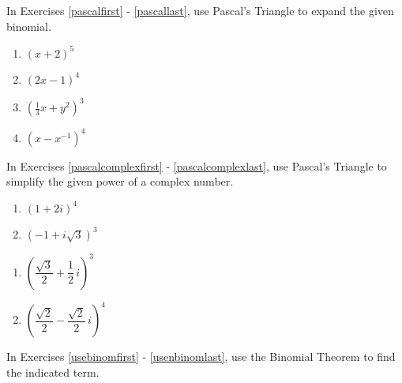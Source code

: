 \documentclass{ximera}
\begin{document}
In Exercises \ref{pascalfirst} - \ref{pascallast}, use Pascal's Triangle to expand the given binomial.

\begin{multicols}{4}
\begin{enumerate}
\setcounter{enumi}{\value{HW}}


\item  $(x+2)^5$ \label{pascalfirst}

\item  $(2x-1)^4$

\item  $\left(\frac{1}{3} x +  y^2\right)^3$

\item  $\left(x - x^{-1} \right)^{4}$ \label{pascallast}

\setcounter{HW}{\value{enumi}}
\end{enumerate}
\end{multicols}

In Exercises \ref{pascalcomplexfirst} - \ref{pascalcomplexlast},   use Pascal's Triangle to simplify the given power of a complex number.

\begin{multicols}{2}
\begin{enumerate}
\setcounter{enumi}{\value{HW}}

\item  $(1+2i)^4$ \label{pascalcomplexfirst}

\item  $\left(-1 + i \sqrt{3}\right)^3$

\setcounter{HW}{\value{enumi}}
\end{enumerate}
\end{multicols}

\begin{multicols}{2}
\begin{enumerate}
\setcounter{enumi}{\value{HW}}

\item  $\left(\dfrac{\sqrt{3}}{2} +  \dfrac{1}{2}\, i\right)^3$

\item  $\left(\dfrac{\sqrt{2}}{2} - \dfrac{\sqrt{2}}{2} \, i\right)^4$  \label{pascalcomplexlast}

\setcounter{HW}{\value{enumi}}
\end{enumerate}
\end{multicols}

In Exercises \ref{usebinomfirst} - \ref{usenbinomlast}, use the Binomial Theorem to find the indicated term.
\end{document}
